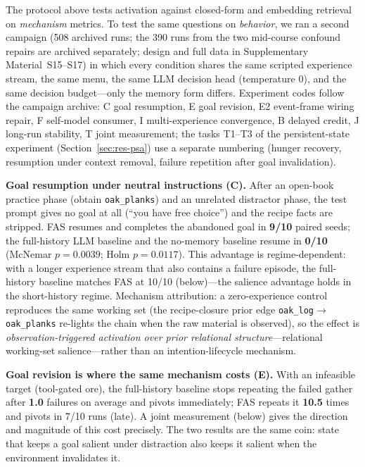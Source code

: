 \documentclass[10pt]{article}
\begin{document}
The protocol above tests activation against closed-form and embedding
retrieval on \emph{mechanism} metrics. To test the same questions on
\emph{behavior}, we ran a second campaign (508 archived runs; the 390
runs from the two mid-course confound repairs are archived
separately; design and full data in Supplementary
Material~S15--S17) in which every condition shares the same scripted
experience stream, the same menu, the same LLM decision head
(temperature 0), and the same decision budget---only the memory form differs. Experiment codes follow the campaign archive: C goal resumption, E goal revision, E2 event-frame wiring repair, F self-model consumer, I multi-experience convergence, B delayed credit, J long-run stability, T joint measurement; the tasks T1--T3 of the persistent-state experiment (Section~\ref{sec:res-psa}) use a separate numbering (hunger recovery, resumption under context removal, failure repetition after goal invalidation).

\textbf{Goal resumption under neutral instructions (C).} After an
open-book practice phase (obtain \texttt{oak\_planks}) and an unrelated
distractor phase, the test prompt gives no goal at all
(``you have free choice'') and the recipe facts are stripped. FAS
resumes and completes the abandoned goal in \textbf{9/10} paired seeds;
the full-history LLM baseline and the no-memory baseline resume in
\textbf{0/10} (McNemar $p{=}0.0039$; Holm $p{=}0.0117$). This advantage
is regime-dependent: with a longer experience stream that also contains
a failure episode, the full-history baseline matches FAS at 10/10
(below)---the salience advantage holds in the short-history regime.
Mechanism attribution: a zero-experience control reproduces the
same working set (the recipe-closure prior edge
\texttt{oak\_log}$\rightarrow$\texttt{oak\_planks} re-lights the chain
when the raw material is observed), so the effect is
\emph{observation-triggered activation over prior relational
structure}---relational working-set salience---rather than an
intention-lifecycle mechanism.

\textbf{Goal revision is where the same mechanism costs (E).} With an
infeasible target (tool-gated ore), the full-history baseline stops
repeating the failed gather after \textbf{1.0} failures on average and
pivots immediately; FAS repeats it \textbf{10.5} times and pivots in
7/10 runs (late). A joint measurement (below) gives the direction and
magnitude of this cost precisely. The two results are the same coin: state that keeps
a goal salient under distraction also keeps it salient when the
environment invalidates it.
\end{document}
